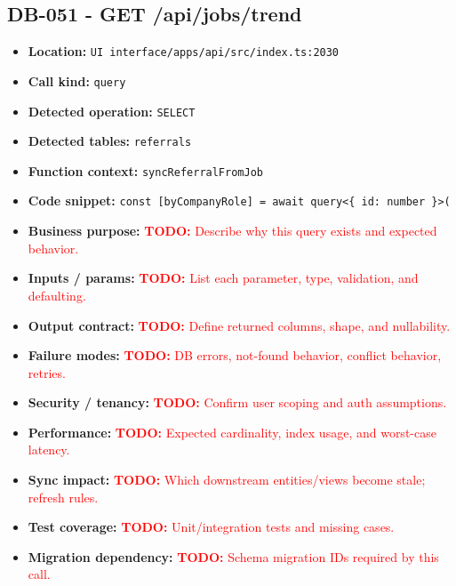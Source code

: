 \documentclass[11pt]{article}
\newcommand{\todoitem}[1]{\textcolor{red}{\textbf{TODO:} #1}}
\begin{document}
\subsection{DB-051 - GET /api/jobs/trend}
\begin{itemize}[leftmargin=1.5em]
\item \textbf{Location:} \texttt{UI interface/apps/api/src/index.ts:2030}
\item \textbf{Call kind:} \texttt{query}
\item \textbf{Detected operation:} \texttt{SELECT}
\item \textbf{Detected tables:} \texttt{referrals}
\item \textbf{Function context:} \texttt{syncReferralFromJob}
\item \textbf{Code snippet:} \texttt{const [byCompanyRole] = await query<\{ id: number \}>(}
\item \textbf{Business purpose:} \todoitem{Describe why this query exists and expected behavior.}
\item \textbf{Inputs / params:} \todoitem{List each parameter, type, validation, and defaulting.}
\item \textbf{Output contract:} \todoitem{Define returned columns, shape, and nullability.}
\item \textbf{Failure modes:} \todoitem{DB errors, not-found behavior, conflict behavior, retries.}
\item \textbf{Security / tenancy:} \todoitem{Confirm user scoping and auth assumptions.}
\item \textbf{Performance:} \todoitem{Expected cardinality, index usage, and worst-case latency.}
\item \textbf{Sync impact:} \todoitem{Which downstream entities/views become stale; refresh rules.}
\item \textbf{Test coverage:} \todoitem{Unit/integration tests and missing cases.}
\item \textbf{Migration dependency:} \todoitem{Schema migration IDs required by this call.}
\end{itemize}
\end{document}
